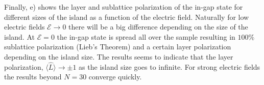 Finally, e) shows the layer and sublattice polarization of the in-gap state for different sizes of the island as a function of the electric field. Naturally for low electric fields $\mathcal{E}\to0$ there will be a big difference depending on the size of the island. At $\mathcal{E}=0$ the in-gap state is spread all over the sample resulting in $100\%$ sublattice polarization (Lieb's Theorem) and a certain layer polarization depending on the island size. The results seems to indicate that the layer polarization, $\langle\hat{L}\rangle\to\pm1$ as the island size goes to infinite. For strong electric fields the results beyond $N=30$ converge quickly.




%   
%   
%   
